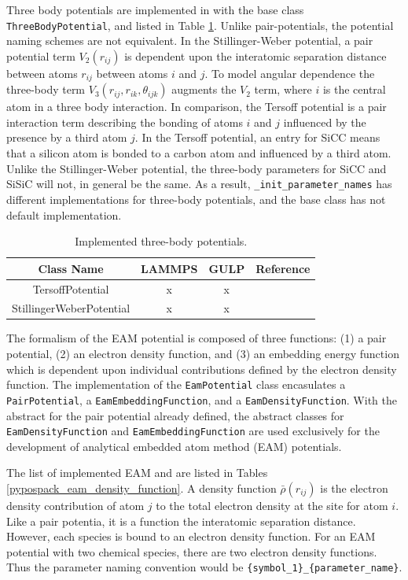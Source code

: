 Three body potentials are implemented in with the base class \verb|ThreeBodyPotential|, and listed in Table \ref{tbl:pypospack_threebody_potentials}.  Unlike pair-potentials, the potential naming schemes are not equivalent.  In the Stillinger-Weber potential\cite{stillinger1985_sw}, a pair potential term $V_2(r_{ij})$ is dependent upon the interatomic separation distance between atoms $r_{ij}$ between atoms $i$ and $j$.  To model angular dependence the three-body term $V_3(r_{ij},r_{ik},\theta_{ijk})$ augments the $V_2$ term, where $i$ is the central atom in a three body interaction.  In comparison, the Tersoff potential\cite{tersoff1988_tersoff} is a pair interaction term describing the bonding of atoms $i$ and $j$ influenced by the presence by a third atom $j$.  In the Tersoff potential, an entry for SiCC means that a silicon atom is bonded to a carbon atom and influenced by a third atom.  Unlike the Stillinger-Weber potential, the three-body parameters for SiCC and SiSiC will not, in general be the same.  As a result, \verb|_init_parameter_names| has different implementations for three-body potentials, and the base class has not default implementation.

\begin{table}[ht]
	\centering
	\caption{Implemented three-body potentials.}
	\label{tbl:pypospack_threebody_potentials}
	\begin{tabular}{cccc}
		\hline
		{Class Name} & LAMMPS & GULP & Reference \\
		\hline
		TersoffPotential & x & x & \cite{tersoff1988_tersoff} \\
		StillingerWeberPotential & x & x &\cite{stillinger1985_sw} \\
		\hline
	\end{tabular}
\end{table}

The formalism of the EAM potential is composed of three functions: (1) a pair potential, (2) an electron density function, and (3) an embedding energy function which is dependent upon individual contributions defined by the electron density function.  
The implementation of the \verb|EamPotential| class encasulates  a \verb|PairPotential|, a \verb|EamEmbeddingFunction|, and a \verb|EamDensityFunction|.  With the abstract for the pair potential already defined, the abstract classes for \verb|EamDensityFunction| and \verb|EamEmbeddingFunction| are used exclusively for the development of analytical embedded atom method (EAM) potentials.

The list of implemented EAM and are listed in Tables \ref{pypospack_eam_density_function}.  A density function $\bar{\rho}(r_{ij})$ is the electron density contribution of atom $j$ to the total electron density at the site for atom $i$.  Like a pair potentia, it is a function the interatomic separation distance.  However, each species is bound to an electron density function.  For an EAM potential with two chemical species, there are two electron density functions.  Thus the parameter naming convention would be \verb|{symbol_1}_{parameter_name}|.

